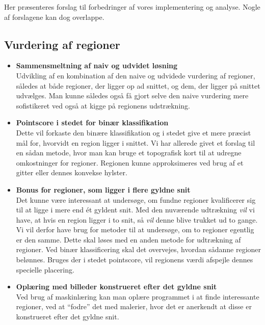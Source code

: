 {
{\sffamily Her præsenteres forslag til forbedringer af vores
implementering og analyse. Nogle af forslagene kan dog overlappe.
}

\subsection{Vurdering af regioner}
\begin{itemize}
    \item \textbf{Sammensmeltning af naiv og udvidet løsning}\\
        Udvikling af en kombination af den naive og udvidede vurdering
        af regioner, således at både regioner, der ligger op ad snittet,
        og dem, der ligger på snittet udvælges. Man kunne således også
        få gjort selve den naive vurdering mere sofistikeret ved også at
        kigge på regionens udstrækning.
    \item \textbf{Pointscore i stedet for binær klassifikation}\\
        Dette vil forkaste den binære klassifikation og i stedet give et
        mere præcist mål for, hvorvidt en region ligger i snittet.  Vi
        har allerede givet et forslag til en sådan metode, hvor man kan
        bruge et topografisk kort til at udregne omkostninger for
        regioner.  Regionen kunne approksimeres ved brug af et gitter
        eller dennes konvekse hylster.
    \item \textbf{Bonus for regioner, som ligger i flere gyldne snit}\\
        Det kunne være interessant at undersøge, om fundne regioner
        kvalificerer sig til at ligge i mere end ét gyldent snit. Med
        den nuværende udtrækning \emph{vil} vi have, at hvis en region
        ligger i to snit, så \emph{vil} denne blive trukket ud to gange.
        Vi vil derfor have brug for metoder til at undersøge, om to
        regioner egentlig er den samme. Dette skal løses med en anden
        metode for udtrækning af regioner. Ved binær klassificering skal
        det overvejes, hvordan sådanne regioner belønnes. Bruges der i
        stedet pointscore, vil regionens værdi afspejle dennes specielle
        placering.
    \item \textbf{Oplæring med billeder konstrueret efter det gyldne
        snit}\\
        Ved brug af maskinlæring kan man oplære programmet i at finde
        interessante regioner, ved at ``fodre'' det med malerier, hvor
        det er anerkendt at disse er konstrueret efter det gyldne snit.

\end{itemize}}
